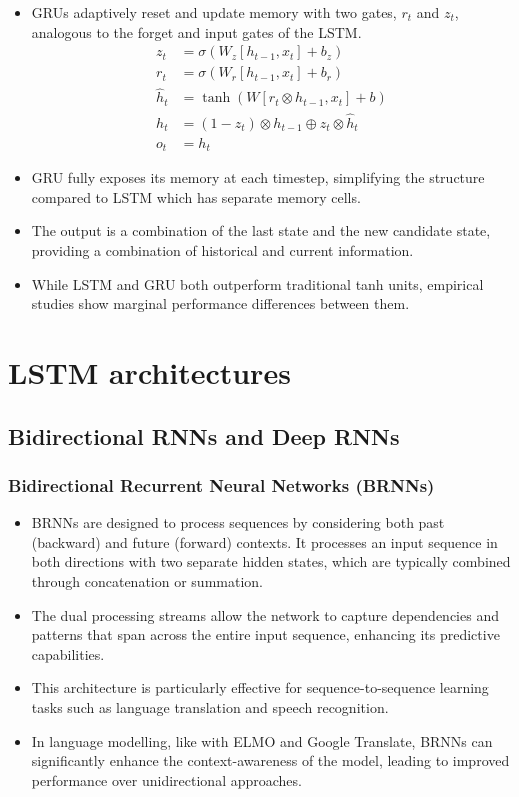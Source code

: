 \begin{itemize}
    \item GRUs adaptively reset and update memory with two gates, \( r_t \) and \( z_t \), analogous to the forget and input gates of the LSTM.
    \begin{align*}
        z_t &= \sigma(W_z [h_{t-1}, x_t] + b_z) \\
        r_t &= \sigma(W_r [h_{t-1}, x_t] + b_r) \\
        \hat{h}_t &= \tanh(W [r_t \otimes h_{t-1}, x_t] + b) \\
        h_t &= (1 - z_t) \otimes h_{t-1} \oplus z_t \otimes \hat{h}_t \\
        o_t &= h_t
    \end{align*}
    \item GRU fully exposes its memory at each timestep, simplifying the structure compared to LSTM which has separate memory cells.
    \item The output is a combination of the last state and the new candidate state, providing a combination of historical and current information.
    \item While LSTM and GRU both outperform traditional tanh units, empirical studies show marginal performance differences between them.
\end{itemize}


\section{LSTM architectures}


\subsection{Bidirectional RNNs and Deep RNNs }

\subsubsection*{Bidirectional Recurrent Neural Networks (BRNNs)}
\begin{itemize}
    \item BRNNs are designed to process sequences by considering both past (backward) and future (forward) contexts. It processes an input sequence in both directions with two separate hidden states, which are typically combined through concatenation or summation.
    \item The dual processing streams allow the network to capture dependencies and patterns that span across the entire input sequence, enhancing its predictive capabilities.
    \item This architecture is particularly effective for sequence-to-sequence learning tasks such as language translation and speech recognition.
    \item In language modelling, like with ELMO and Google Translate, BRNNs can significantly enhance the context-awareness of the model, leading to improved performance over unidirectional approaches.

\end{itemize}

